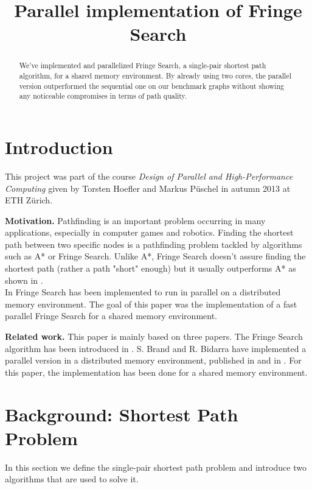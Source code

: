\documentclass[letterpaper]{article}
\title{Parallel implementation of Fringe Search}
\newcommand{\mypar}[1]{{\bf #1.}}
\begin{document}
%
\maketitle
%

\begin{abstract}
We've implemented and parallelized Fringe Search, a single-pair shortest path algorithm, for a shared memory environment. By already using two cores, the parallel version outperformed the sequential one on our benchmark graphs without showing any noticeable compromises in terms of path quality.
\end{abstract}

\section{Introduction}\label{sec:intro}

This project was part of the course \textit{Design of Parallel and High-Performance Computing} given by Torsten Hoefler and Markus Püschel in autumn 2013 at ETH Zürich.


\mypar{Motivation} 
Pathfinding is an important problem occurring in many applications, especially in computer games and robotics. Finding the shortest path between two specific nodes is a pathfinding problem tackled by algorithms such as A* or Fringe Search. Unlike A*, Fringe Search doesn't assure finding the shortest path (rather a path "short" enough) but it usually outperforms A* as shown in \cite{fringe:05}.\\
In \cite{brand:09} Fringe Search has been implemented to run in parallel on a distributed memory environment. The goal of this paper was the implementation of a fast parallel Fringe Search for a shared memory environment.

\mypar{Related work} This paper is mainly based on three papers. The Fringe Search algorithm has been introduced in \cite{fringe:05}. S. Brand and R. Bidarra have implemented a parallel version in a distributed memory environment, published in \cite{brand:09} and in \cite{brand:12}. For this paper, the implementation has been done for a shared memory environment.

\section{Background: Shortest Path Problem}\label{sec:background}
In this section we define the single-pair shortest path problem and introduce two algorithms that are used to solve it.
\end{document}
